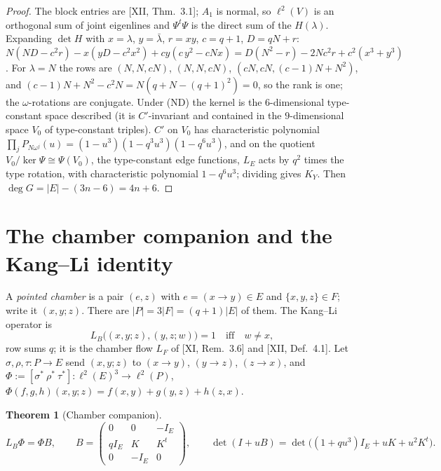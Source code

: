\documentclass[11pt]{amsart}
\numberwithin{equation}{section}
\newtheorem{theorem}{Theorem}[section]
\theoremstyle{definition}
\theoremstyle{remark}
\newcommand{\LE}{L_E}
\newcommand{\LB}{L_B}
\begin{document}
\begin{proof}
The block entries are [XII, Thm.~3.1]; $A_1$ is normal, so $\ell^{2}(V)$ is an orthogonal sum of
joint eigenlines and $\Psi^{t}\Psi$ is the direct sum of the $H(\lambda)$. Expanding
$\det H$ with $x=\lambda$, $y=\bar\lambda$, $r=xy$, $c=q{+}1$, $D=qN+r$:
$N(ND-c^{2}r)-x(yD-c^{2}x^{2})+cy(c\,y^{2}-cNx)=D(N^{2}-r)-2Nc^{2}r+c^{2}(x^{3}+y^{3})$. For
$\lambda=N$ the rows are $(N,N,cN)$, $(N,N,cN)$, $(cN,cN,(c-1)N+N^{2})$, and
$(c-1)N+N^{2}-c^{2}N=N(q+N-(q{+}1)^{2})=0$, so the rank is one; the $\omega$-rotations are
conjugate. Under (ND) the kernel is the $6$-dimensional type-constant space described (it is
$C'$-invariant and contained in the $9$-dimensional space $V_0$ of type-constant triples).
$C'$ on $V_0$ has characteristic polynomial $\prod_jP_{N\omega^{j}}(u)=(1-u^{3})(1-q^{3}u^{3})(1-q^{6}u^{3})$,
and on the quotient $V_0/\ker\Psi\cong\Psi(V_0)$, the type-constant edge functions, $\LE$
acts by $q^{2}$ times the type rotation, with characteristic polynomial $1-q^{6}u^{3}$; dividing
gives $K_Y$. Then $\deg G=|E|-(3n-6)=4n+6$.
\end{proof}

\section{The chamber companion and the Kang--Li identity}\label{sec:chamber}

A \emph{pointed chamber} is a pair $(e,z)$ with $e=(x\to y)\in E$ and $\{x,y,z\}\in F$; write
it $(x,y;z)$. There are $|P|=3|F|=(q{+}1)|E|$ of them. The Kang--Li operator \cite{KL} is
\[
\LB\bigl((x,y;z),(y,z;w)\bigr)=1\quad\text{iff}\quad w\ne x ,
\]
row sums $q$; it is the chamber flow $L_F$ of [XI, Rem.~3.6] and [XII, Def.~4.1]. Let
$\sigma,\rho,\tau\colon P\to E$ send $(x,y;z)$ to $(x\to y)$, $(y\to z)$, $(z\to x)$, and
$\Phi:=[\sigma^{*}\ \rho^{*}\ \tau^{*}]\colon\ell^{2}(E)^{3}\to\ell^{2}(P)$,
$\Phi(f,g,h)(x,y;z)=f(x,y)+g(y,z)+h(z,x)$.

\begin{theorem}[Chamber companion]\label{thm:companion}
\[
\LB\Phi=\Phi B,\qquad B=\begin{pmatrix}0&0&-I_E\\ qI_E&K&K^{t}\\0&-I_E&0\end{pmatrix},
\qquad \det(I+uB)=\det\bigl((1+qu^{3})I_E+uK+u^{2}K^{t}\bigr).
\]
\end{theorem}
\end{document}
